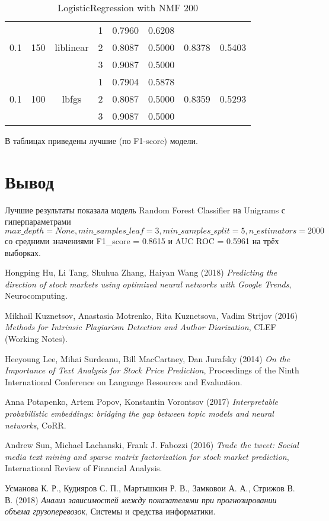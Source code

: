 \documentclass[12pt, twoside]{article}
\begin{document}
\begin{landscape}
\begin{table}[!htbp]
\begin{tabular}{cccccccc}
  	\cmidrule(r){4-8}
  	&	&	&	1	&	0.7960	&	0.6208	&		&	 \\
  0.1	&	150	&	liblinear	&	2	&	0.8087	&	0.5000	&	0.8378	&	0.5403 \\
  	&	&	&	3	&	0.9087	&	0.5000	&		&	 \\
  	\cmidrule(r){4-8}
  	&	&	&	1	&	0.7904	&	0.5878	&		&	 \\
   0.1	&	100	&	lbfgs	&	2	&	0.8087	&	0.5000	&	0.8359	&	0.5293 \\
  	&	&	&	3	&	0.9087	&	0.5000	&		&	 \\
  \bottomrule
  \end{tabular}
  \caption{LogisticRegression with NMF 200}
\end{table}
\end{landscape}

\newpage

В таблицах приведены лучшие (по F1-score) модели.

\section{Вывод}

Лучшие результаты показала модель Random Forest Classifier на Unigrams с гиперпараметрами $max\_depth = None, min\_samples\_leaf = 3, min\_samples\_split = 5, n\_estimators = 2000$ со средними значениями F1\_score = 0.8615 и AUC ROC = 0.5961 на трёх выборках.

\begin{thebibliography}{9}
Hongping Hu, Li Tang, Shuhua Zhang, Haiyan Wang (2018) \emph{Predicting the direction of stock markets using optimized neural networks with Google Trends}, Neurocomputing.

Mikhail Kuznetsov, Anastasia Motrenko, Rita Kuznetsova, Vadim Strijov (2016) \emph{Methods for Intrinsic Plagiarism Detection and Author Diarization}, CLEF (Working Notes).

Heeyoung Lee, Mihai Surdeanu, Bill MacCartney, Dan Jurafsky (2014) \emph{On the Importance of Text Analysis for Stock Price Prediction}, Proceedings of the Ninth International Conference on Language Resources and Evaluation.

Anna Potapenko, Artem Popov, Konstantin Vorontsov (2017) \emph{Interpretable probabilistic embeddings: bridging the gap between topic models and neural networks}, CoRR.

Andrew Sun, Michael Lachanski, Frank J. Fabozzi (2016) \emph{Trade the tweet: Social media text mining and sparse matrix factorization for stock market prediction}, International Review of Financial Analysis.

Усманова К. Р., Кудияров С. П., Мартышкин Р. В., Замковои А. А., Стрижов В. В. (2018) \emph{Анализ зависимостей между показателями при прогнозировании объема грузоперевозок}, Системы и средства информатики.
\end{thebibliography}
\end{document}
